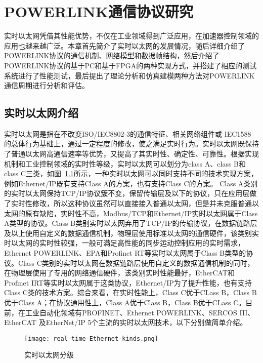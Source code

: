 
\chapter{POWERLINK通信协议研究}

实时以太网凭借其性能优势，不仅在工业领域得到广泛应用，在加速器控制领域的应用也越来越广泛。本章首先简介了实时以太网的发展情况，随后详细介绍了POWERLINK协议的通信机制、网络模型和数据帧结构，然后介绍了POWERLINK协议的基于PC和基于FPGA的两种实现方式，并搭建了相应的测试系统进行了性能测试，最后提出了理论分析和仿真建模两种方法对POWERLINK通信周期进行分析和评估。

\section{实时以太网介绍}

实时以太网是指在不改变ISO/IEC8802-3的通信特征、相关网络组件或 IEC1588 的总体行为基础上，通过一定程度的修改，使之满足实时行为。实时以太网既保持了普通以太网高通信速率等优势，又提高了其实时性、确定性、可靠性\cite{Hao2018}。根据实现机制和工业控制领域的实时性等级，实时以太网可以划分为class A、class B和class C三类\cite{wei2013}，如图~\ref{fig:real-time Ethernet kinds}所示，一种实时以太网可以同时支持不同的技术实现方案，例如Ethernet/IP既有支持Class A的方案，也有支持Class C的方案。
Class A类别的实时以太网保持TCP/IP协议簇不变，保留传输层及以下的协议，只在应用层做了实时性修改，所以这种协议虽然可以直接接入普通以太网，但是并未克服普通以太网的原有缺陷，实时性不高，Modbus/TCP和Ethernet/IP实时以太网属于Class A类型的协议。Class B类别实时以太网弃用了TCP/IP的传输协议，在数据链路层及以上使用自定义的数据通信机制，物理层使用标准以太网的通信硬件，该类别实时以太网的实时性较强，一般可满足高性能的同步运动控制应用的实时需求，Ethernet POWERLINK、EPA和Profinet RT等实时以太网属于Class B类型的协议。Class C类别的实时以太网在数据链路层使用自定义的数据通信机制的同时，在物理层使用了专用的网络通信硬件，该类别实时性能最好，EtherCAT和Profinet IRT等实时以太网属于这类协议，Ethernet/IP为了提升性能，也有支持Class C类的技术方案。综合来看，在实时性能上，Class C优于CLass B，Class B优于Class A；在协议通用性上，Class A优于Class B，Class B优于CLass C。目前，在工业自动化领域有PROFINET、Ethernet POWERLINK、SERCOS III、EtherCAT 及EtherNet/IP 5个主流的实时以太网技术，以下分别做简单介绍。

\begin{figure}[!htb]
  \centering
  \texttt{[image: real-time-Ethernet-kinds.png]}
  \caption{实时以太网分级}
  \label{fig:real-time Ethernet kinds}
\end{figure}


